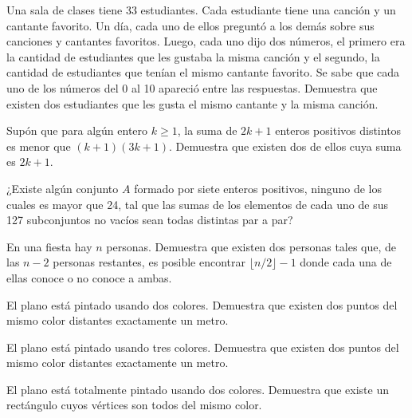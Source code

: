 \documentclass[11pt]{scrartcl}
\begin{document}
\begin{problem}[Rusia 1997]
Una sala de clases tiene 33 estudiantes. Cada estudiante tiene una canción y un cantante favorito. Un día, cada uno de ellos preguntó a los demás sobre sus canciones y cantantes favoritos. Luego, cada uno dijo dos números, el primero era la cantidad de estudiantes que les gustaba la misma canción y el segundo, la cantidad de estudiantes que tenían el mismo cantante favorito. Se sabe que cada uno de los números del 0 al 10 apareció entre las respuestas. Demuestra que existen dos estudiantes que les gusta el mismo cantante y la misma canción.
\end{problem}

\begin{problem}
Supón que para algún entero \(k \geq 1\), la suma de \(2k + 1\) enteros positivos distintos es menor que \((k + 1)(3k + 1)\). Demuestra que existen dos de ellos cuya suma es \(2k + 1\).
\end{problem}

\begin{problem}
¿Existe algún conjunto \(A\) formado por siete enteros positivos, ninguno de los cuales es mayor que 24, tal que las sumas de los elementos de cada uno de sus 127 subconjuntos no vacíos sean todas distintas par a par?
\end{problem}

\begin{problem}[USAMO 1985]
En una fiesta hay \(n\) personas. Demuestra que existen dos personas tales que, de las \(n - 2\) personas restantes, es posible encontrar \(\lfloor n/2 \rfloor - 1\) donde cada una de ellas conoce o no conoce a ambas.
\end{problem}

\begin{problem}
El plano está pintado usando dos colores. Demuestra que existen dos puntos del mismo color distantes exactamente un metro.
\end{problem}

\begin{problem}[Putnam]
El plano está pintado usando tres colores. Demuestra que existen dos puntos del mismo color distantes exactamente un metro.
\end{problem}

\begin{problem}
El plano está totalmente pintado usando dos colores. Demuestra que existe un rectángulo cuyos vértices son todos del mismo color.
\end{problem}
\end{document}
